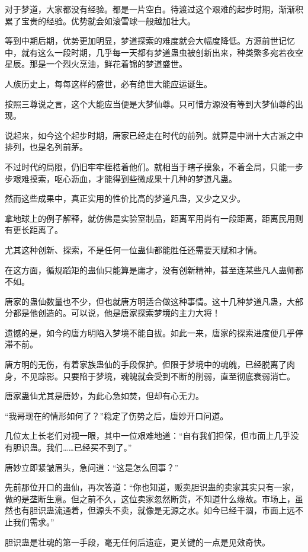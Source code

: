 \begin{this_body}
对于梦道，大家都没有经验。都是一片空白。待渡过这个艰难的起步时期，渐渐积累了宝贵的经验。优势就会如滚雪球一般越加壮大。

等到中期后期，优势更加明显，梦道探索的难度就会大幅度降低。方源前世记忆中，就有这么一段时期，几乎每一天都有梦道蛊虫被创新出来，种类繁多宛若夜空星辰。那是一个烈火烹油，鲜花着锦的梦道盛世。

人族历史上，每每这样的盛世，必有绝世大能应运诞生。

按照三尊说之言，这个大能应当便是大梦仙尊。只可惜方源没有等到大梦仙尊的出现。

说起来，如今这个起步时期，唐家已经走在时代的前列。就算是中洲十大古派之中排列，也是名列前茅。

不过时代的局限，仍旧牢牢桎梏着他们。就相当于瞎子摸象，不着全局，只能一步步艰难摸索，呕心沥血，才能得到些微成果十几种的梦道凡蛊。

然而这些成果中，真正实用的性价比高的梦道凡蛊，又少之又少。

拿地球上的例子解释，就仿佛是实验室制品，距离军用尚有一段距离，距离民用则有更长距离了。

尤其这种创新、探索，不是任何一位蛊仙都能胜任还需要天赋和才情。

在这方面，循规蹈矩的蛊仙只能算是庸才，没有创新精神，甚至连某些凡人蛊师都不如。

唐家的蛊仙数量也不少，但也就唐方明适合做这种事情。这十几种梦道凡蛊，大部分都是他创造的。可以说，他是唐家探索梦境的主力大将！

遗憾的是，如今的唐方明陷入梦境不能自拔。如此一来，唐家的探索进度便几乎停滞不前。

唐方明的无伤，有着家族蛊仙的手段保护。但限于梦境中的魂魄，已经脱离了肉身，不见踪影。只要陷于梦境，魂魄就会受到不断的削弱，直至彻底衰弱消亡。

唐家蛊仙尤其是唐妙，为此心急如焚，但却有心无力。

“我哥现在的情形如何了？”稳定了伤势之后，唐妙开口问道。

几位太上长老们对视一眼，其中一位艰难地道：“自有我们担保，但市面上几乎没有胆识蛊。我们……已经买不到了。”

唐妙立即紧皱眉头，急问道：“这是怎么回事？”

先前那位开口的蛊仙，再次答道：“你也知道，贩卖胆识蛊的卖家其实只有一家，做的是垄断生意。但之前不久，这位卖家忽然断货，不知道什么缘故。市场上，虽然也有胆识蛊流通着，但源头不卖，就像是无源之水。如今已经干涸，市面上远不止我们需求。”

胆识蛊是壮魂的第一手段，毫无任何后遗症，更关键的一点是见效奇快。


\end{this_body}

